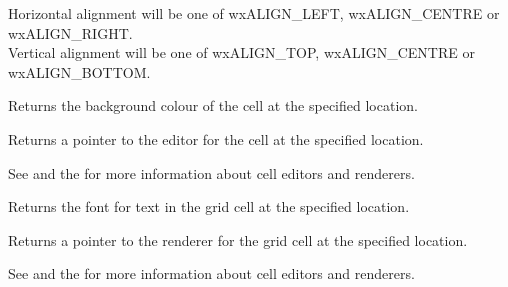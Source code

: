 Horizontal alignment will be one of wxALIGN\_LEFT, wxALIGN\_CENTRE or wxALIGN\_RIGHT. \\
Vertical alignment will be one of wxALIGN\_TOP, wxALIGN\_CENTRE or wxALIGN\_BOTTOM.




\label{wxgridgetcellbackgroundcolour}


Returns the background colour of the cell at the specified location.



\label{wxgridgetcelleditor}


Returns a pointer to the editor for the cell at the specified location.

See  and
the  for more information about cell editors and renderers.



\label{wxgridgetcellfont}


Returns the font for text in the grid cell at the specified location.



\label{wxgridgetcellrenderer}


Returns a pointer to the renderer for the grid cell at the specified location.

See  and
the  for more information about cell editors and renderers.



\label{wxgridgetcelltextcolour}


